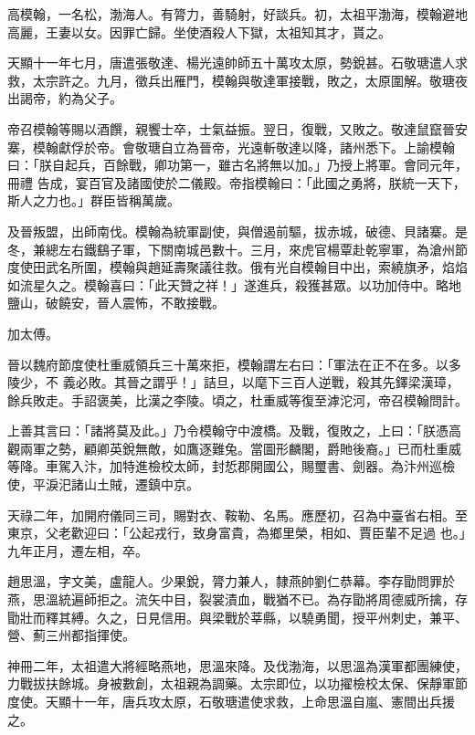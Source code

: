 \begin{pinyinscope}
 高模翰，一名松，渤海人。有膂力，善騎射，好談兵。初，太祖平渤海，模翰避地高麗，王妻以女。因罪亡歸。坐使酒殺人下獄，太祖知其才，貰之。



 天顯十一年七月，唐遣張敬達、楊光遠帥師五十萬攻太原，勢銳甚。石敬瑭遣人求救，太宗許之。九月，徵兵出雁門，模翰與敬達軍接戰，敗之，太原圍解。敬瑭夜出謁帝，約為父子。



 帝召模翰等賜以酒饌，親饗士卒，士氣益振。翌日，復戰，又敗之。敬達鼠竄晉安寨，模翰獻俘於帝。會敬瑭自立為晉帝，光遠斬敬達以降，諸州悉下。上諭模翰曰：「朕自起兵，百餘戰，卿功第一，雖古名將無以加。」乃授上將軍。會同元年，冊禮
 告成，宴百官及諸國使於二儀殿。帝指模翰曰：「此國之勇將，朕統一天下，斯人之力也。」群臣皆稱萬歲。



 及晉叛盟，出師南伐。模翰為統軍副使，與僧遏前驅，拔赤城，破德、貝諸寨。是冬，兼總左右鐵鷂子軍，下關南城邑數十。三月，來虎官楊覃赴乾寧軍，為滄州節度使田武名所圍，模翰與趙延壽聚議往救。俄有光自模翰目中出，索繞旗矛，焰焰如流星久之。模翰喜曰：「此天贊之祥！」遂進兵，殺獲甚眾。以功加侍中。略地鹽山，破饒安，晉人震怖，不敢接戰。



 加太傅。



 晉以魏府節度使杜重威領兵三十萬來拒，模翰謂左右曰：「軍法在正不在多。以多陵少，不
 義必敗。其晉之謂乎！」詰旦，以麾下三百人逆戰，殺其先鐸梁漢璋，餘兵敗走。手詔褒美，比漢之李陵。頃之，杜重威等復至滹沱河，帝召模翰問計。



 上善其言曰：「諸將莫及此。」乃令模翰守中渡橋。及戰，復敗之，上曰：「朕憑高觀兩軍之勢，顧卿英銳無敵，如鷹逐難兔。當圖形麟閣，爵貤後裔。」已而杜重威等降。車駕入汴，加特進檢校太師，封悊郡開國公，賜璽書、劍器。為汴州巡檢使，平淚汜諸山土賊，遷鎮中京。



 天祿二年，加開府儀同三司，賜對衣、鞍勒、名馬。應歷初，召為中臺省右相。至東京，父老歡迎曰：「公起戎行，致身富貴，為鄉里榮，相如、賈臣輩不足過
 也。」九年正月，遷左相，卒。



 趙思溫，字文美，盧龍人。少果銳，膂力兼人，隸燕帥劉仁恭幕。李存勖問罪於燕，思溫統遍師拒之。流矢中目，裂裳漬血，戰猶不已。為存勖將周德威所擒，存勖壯而釋其縛。久之，日見信用。與梁戰於莘縣，以驍勇聞，授平州刺史，兼平、營、薊三州都指揮使。



 神冊二年，太祖遣大將經略燕地，思溫來降。及伐渤海，以思溫為漢軍都團練使，力戰拔扶餘城。身被數創，太祖親為調藥。太宗即位，以功擢檢校太保、保靜軍節度使。天顯十一年，唐兵攻太原，石敬瑭遣使求救，上命思溫自嵐、憲間出兵援之。




\end{pinyinscope}
